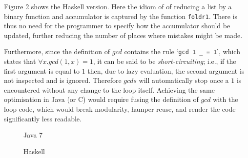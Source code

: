 Figure \ref{fig:gcds:haskell} shows the Haskell version. Here the idiom
of of reducing a list by a binary function and accumulator is captured
by the function \lstinline|foldr1|. There is thus no need for the programmer
to specify how the accumulator should be updated,
further reducing the number of places where mistakes might be made.

Furthermore, since the definition of $gcd$ contains the rule
`\lstinline|gcd 1 _ = 1|',
which states that $\forall x. gcd (1, x) = 1$, it can be said to be
\emph{short-circuiting}; i.e., if the first argument is equal to 1 then, due
to lazy evaluation, the second argument is not inspected and is ignored.
Therefore $gcds$ will automatically stop once a $1$ is encountered without any
change to the loop itself. Achieving the same optimisation in Java (or C) would
require fusing the definition of $gcd$ with the loop code, which would break
modularity, hamper reuse, and render the code significantly less readable.

% 

\begin{figure}

\caption{Java 7}
\label{fig:gcds:java}
\end{figure}

\begin{figure}

\caption{Haskell}
\label{fig:gcds:haskell}
\end{figure}





